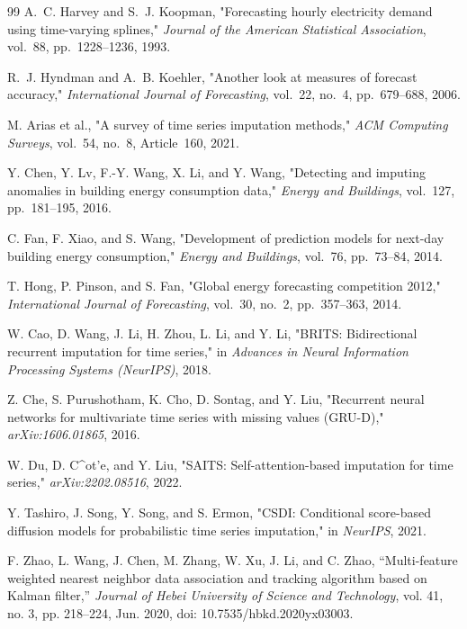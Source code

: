 \begin{thebibliography}{99}
A.~C. Harvey and S.~J. Koopman, "Forecasting hourly electricity demand using time-varying splines," \emph{Journal of the American Statistical Association}, vol.~88, pp.~1228--1236, 1993.

R.~J. Hyndman and A.~B. Koehler, "Another look at measures of forecast accuracy," \emph{International Journal of Forecasting}, vol.~22, no.~4, pp.~679--688, 2006.

M. Arias et al., "A survey of time series imputation methods," \emph{ACM Computing Surveys}, vol.~54, no.~8, Article~160, 2021.

Y. Chen, Y. Lv, F.-Y. Wang, X. Li, and Y. Wang, "Detecting and imputing anomalies in building energy consumption data," \emph{Energy and Buildings}, vol.~127, pp.~181--195, 2016.

C. Fan, F. Xiao, and S. Wang, "Development of prediction models for next-day building energy consumption," \emph{Energy and Buildings}, vol.~76, pp.~73--84, 2014.

T. Hong, P. Pinson, and S. Fan, "Global energy forecasting competition 2012," \emph{International Journal of Forecasting}, vol.~30, no.~2, pp.~357--363, 2014.

W. Cao, D. Wang, J. Li, H. Zhou, L. Li, and Y. Li, "BRITS: Bidirectional recurrent imputation for time series," in \emph{Advances in Neural Information Processing Systems (NeurIPS)}, 2018.

Z. Che, S. Purushotham, K. Cho, D. Sontag, and Y. Liu, "Recurrent neural networks for multivariate time series with missing values (GRU-D)," \emph{arXiv:1606.01865}, 2016.

W. Du, D. C^ot'e, and Y. Liu, "SAITS: Self-attention-based imputation for time series," \emph{arXiv:2202.08516}, 2022.

Y. Tashiro, J. Song, Y. Song, and S. Ermon, "CSDI: Conditional score-based diffusion models for probabilistic time series imputation," in \emph{NeurIPS}, 2021.

F. Zhao, L. Wang, J. Chen, M. Zhang, W. Xu, J. Li, and C. Zhao, ``Multi-feature weighted nearest neighbor data association and tracking algorithm based on Kalman filter,'' \emph{Journal of Hebei University of Science and Technology}, vol. 41, no. 3, pp. 218--224, Jun. 2020, doi: 10.7535/hbkd.2020yx03003.


\end{thebibliography}
